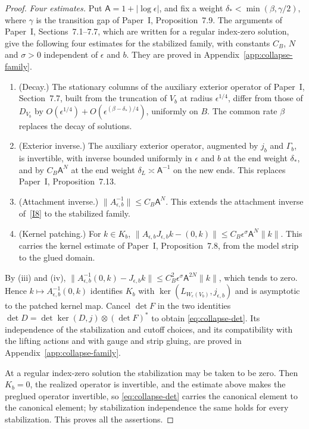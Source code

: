 \documentclass[11pt]{amsart}
\theoremstyle{definition}
\theoremstyle{remark}
\theoremstyle{plain}
\numberwithin{equation}{section}
\begin{document}
\begin{proof}
\emph{Four estimates.} Put $\mathsf A=1+|\log\epsilon|$, and fix a weight
$\delta_*<\min(\beta,\gamma/2)$, where $\gamma$ is the transition gap of
Paper~I, Proposition~7.9. The arguments of Paper~I, Sections~7.1--7.7,
which are written for a regular index-zero solution, give the following
four estimates for the stabilized family, with constants $C_B$, $N$ and
$\sigma>0$ independent of $\epsilon$ and $b$. They are proved in
Appendix~\ref{app:collapse-family}.
\begin{enumerate}[label=(\roman*)]
\item (Decay.) The stationary columns of the auxiliary exterior operator
of Paper~I, Section~7.7, built from the truncation of $V_b$ at radius
$\epsilon^{1/4}$, differ from those of $D_{V_b}$ by
$O(\epsilon^{1/4})+O(\epsilon^{(\beta-\delta_*)/4})$, uniformly on $B$.
The common rate $\beta$ replaces the decay of solutions.
\item (Exterior inverse.) The auxiliary exterior operator, augmented by
$j_b$ and $\Gamma_b$, is invertible, with inverse bounded uniformly in
$\epsilon$ and $b$ at the end weight $\delta_*$, and by $C_B\mathsf A^N$
at the end weight $\delta_L\asymp\mathsf A^{-1}$ on the new ends. This
replaces Paper~I, Proposition~7.13.
\item (Attachment inverse.) $\|A_{\epsilon,b}^{-1}\|\le C_B\mathsf A^N$.
This extends the attachment inverse of~\ref{I8} to the stabilized
family.
\item (Kernel patching.) For $k\in K_b$,
$\|A_{\epsilon,b}J_{\epsilon,b}k-(0,k)\|\le C_B\epsilon^\sigma\mathsf A^N\|k\|$.
This carries the kernel estimate of Paper~I, Proposition~7.8, from the
model strip to the glued domain.
\end{enumerate}
By (iii) and (iv),
$\|A_{\epsilon,b}^{-1}(0,k)-J_{\epsilon,b}k\|\le C_B^2\epsilon^\sigma\mathsf A^{2N}\|k\|$,
which tends to zero. Hence $k\mapsto A_{\epsilon,b}^{-1}(0,k)$ identifies
$K_b$ with $\ker(L_{W_\epsilon(V_b)},j_{\epsilon,b})$ and is asymptotic to
the patched kernel map. Cancel $\det F$ in the two identities
$\det D=\det\ker(D,j)\otimes(\det F)^*$ to obtain
\eqref{eq:collapse-det}. Its independence of the stabilization and cutoff
choices, and its compatibility with the lifting actions and with gauge
and strip gluing, are proved in Appendix~\ref{app:collapse-family}.

At a regular index-zero solution the stabilization may be taken to
be zero. Then $K_b=0$, the realized operator is invertible, and the
estimate above makes the preglued operator invertible, so
\eqref{eq:collapse-det} carries the canonical element to the canonical
element; by stabilization independence the same holds for every
stabilization. This proves all the assertions.
\end{proof}
\end{document}
